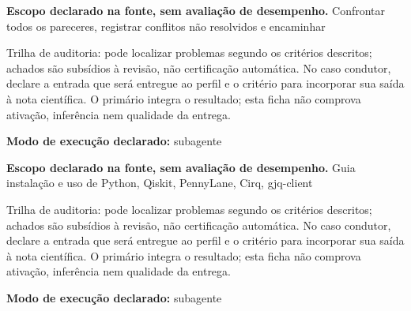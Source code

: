
\begin{descricao}
\textbf{Escopo declarado na fonte, sem avaliação de desempenho.}
Confrontar todos os pareceres, registrar conflitos não resolvidos e encaminhar
\end{descricao}

\begin{funcao}
Trilha de auditoria: pode localizar problemas segundo os critérios descritos; achados são subsídios à revisão, não certificação automática. No caso condutor, declare a entrada que será entregue ao perfil e o critério para incorporar sua saída à nota científica. O primário integra o resultado; esta ficha não comprova ativação, inferência nem qualidade da entrega.
\end{funcao}

\begin{arquitetura}
\textbf{Modo de execução declarado:} subagente
\end{arquitetura}


\begin{descricao}
\textbf{Escopo declarado na fonte, sem avaliação de desempenho.}
Guia instalação e uso de Python, Qiskit, PennyLane, Cirq, gjq-client
\end{descricao}

\begin{funcao}
Trilha de auditoria: pode localizar problemas segundo os critérios descritos; achados são subsídios à revisão, não certificação automática. No caso condutor, declare a entrada que será entregue ao perfil e o critério para incorporar sua saída à nota científica. O primário integra o resultado; esta ficha não comprova ativação, inferência nem qualidade da entrega.
\end{funcao}

\begin{arquitetura}
\textbf{Modo de execução declarado:} subagente
\end{arquitetura}

